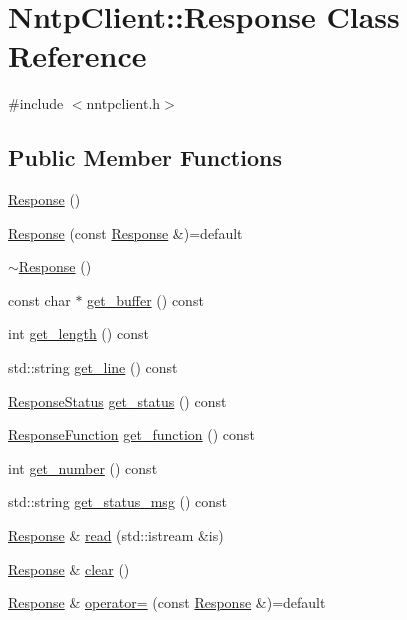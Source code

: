 \hypertarget{class_nntp_client_1_1_response}{}\section{Nntp\+Client\+:\+:Response Class Reference}
\label{class_nntp_client_1_1_response}


{\ttfamily \#include $<$nntpclient.\+h$>$}

\subsection*{Public Member Functions}
\begin{DoxyCompactItemize}
\item 
\hyperlink{class_nntp_client_1_1_response_a9fbd470d7d756f55327bf4ab858989b8}{Response} ()
\item 
\hyperlink{class_nntp_client_1_1_response_a0e01a5eac8b5900fe834d2a2254a77e8}{Response} (const \hyperlink{class_nntp_client_1_1_response}{Response} \&)=default
\item 
\hyperlink{class_nntp_client_1_1_response_a19fab64682ec4d33c0edae79371e8651}{$\sim$\+Response} ()
\item 
const char $\ast$ \hyperlink{class_nntp_client_1_1_response_a1e8cf1ff5d40a519e256c65db6a8496a}{get\+\_\+buffer} () const
\item 
int \hyperlink{class_nntp_client_1_1_response_af9da91909f7e838347dacf4a64f92be9}{get\+\_\+length} () const
\item 
std\+::string \hyperlink{class_nntp_client_1_1_response_a3c184598a661e2509418aae0438588c1}{get\+\_\+line} () const
\item 
\hyperlink{namespace_nntp_client_a920c73a4038b2a2c307245b909b43203}{Response\+Status} \hyperlink{class_nntp_client_1_1_response_a91f3ff944af660439f1e4d1f0fcce6ec}{get\+\_\+status} () const
\item 
\hyperlink{namespace_nntp_client_a2c87b9cd86975a1986a221b9a5885fb8}{Response\+Function} \hyperlink{class_nntp_client_1_1_response_afc9e17cf40b937764e64d54a88a72bfe}{get\+\_\+function} () const
\item 
int \hyperlink{class_nntp_client_1_1_response_a6fcb329845b34c07b7664563d3fddc56}{get\+\_\+number} () const
\item 
std\+::string \hyperlink{class_nntp_client_1_1_response_a5edade79d654037339ce413e45e8e9c0}{get\+\_\+status\+\_\+msg} () const
\item 
\hyperlink{class_nntp_client_1_1_response}{Response} \& \hyperlink{class_nntp_client_1_1_response_a62232211988726cc0c37860b50897131}{read} (std\+::istream \&is)
\item 
\hyperlink{class_nntp_client_1_1_response}{Response} \& \hyperlink{class_nntp_client_1_1_response_acd5875ba908a6ae4796e1a7741df2329}{clear} ()
\item 
\hyperlink{class_nntp_client_1_1_response}{Response} \& \hyperlink{class_nntp_client_1_1_response_a158dfd4073aa9668894bbf230ed069a4}{operator=} (const \hyperlink{class_nntp_client_1_1_response}{Response} \&)=default
\end{DoxyCompactItemize}
